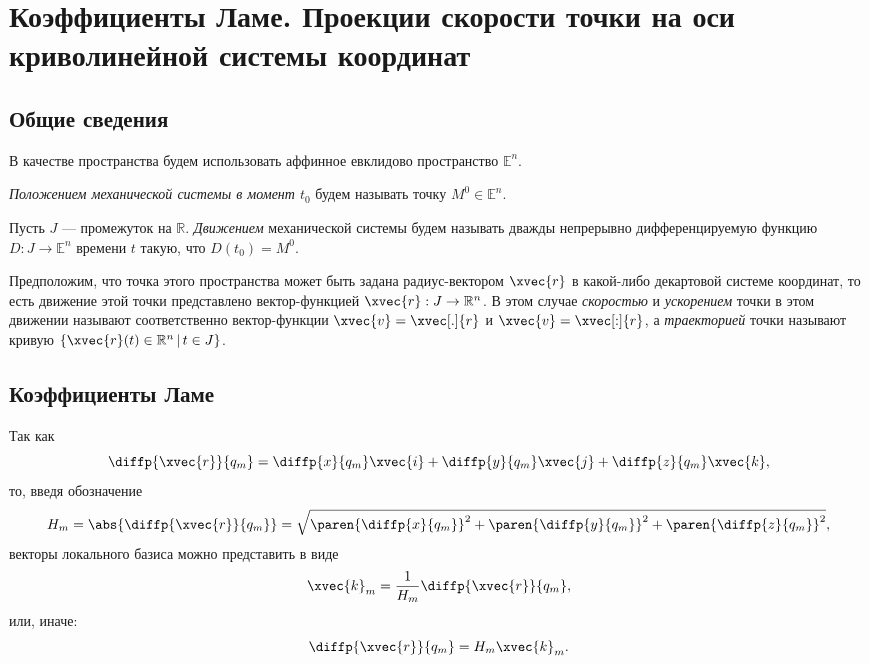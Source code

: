 \section{Коэффициенты Ламе. Проекции скорости точки на оси криволинейной
системы координат}

\subsection{Общие сведения}

В качестве пространства будем использовать аффинное евклидово пространство
$\mathbb{E}^n$.

\begin{definition}
  \textit{Положением механической системы в момент $t_0$} будем называть точку
  $M^0 \in \mathbb{E}^n$.
\end{definition}

\begin{definition}
  Пусть $J$ --- промежуток на $\mathbb{R}$. \textit{Движением} механической
  системы будем называть дважды непрерывно дифференцируемую функцию $D : J \to
  \mathbb{E}^n$ времени $t$ такую, что $D(t_0) = M^0$.
\end{definition}

\begin{definition}
  Предположим, что точка этого пространства может быть задана радиус-вектором
  $\xvec{r}$ в какой-либо декартовой системе координат, то есть движение этой
  точки представлено вектор-функцией $\xvec{r} : J \to \mathbb{R}^n$. В этом
  случае \textit{скоростью} и \textit{ускорением} точки в этом движении
  называют соответственно вектор-функции $\xvec{v} = \xvec[.]{r}$ и
  $\xvec{v} = \xvec[:]{r}$, а \textit{траекторией} точки называют кривую
  $\{ \xvec{r}(t) \in \mathbb{R}^n \, | \, t \in J \}$.
\end{definition}


\subsection{Коэффициенты Ламе}

Так как
\begin{equation}
  \diffp{\xvec{r}}{{q_m}} = \diffp{x}{{q_m}} \xvec{i} + \diffp{y}{{q_m}} \xvec{j} +
  \diffp{z}{{q_m}} \xvec{k},
\end{equation}
то, введя обозначение
\begin{equation}
  H_m = \abs{\diffp{\xvec{r}}{{q_m}}} = \sqrt{\paren{\diffp{x}{{q_m}}}^2 +
  \paren{\diffp{y}{{q_m}}}^2 + \paren{\diffp{z}{{q_m}}}^2},
\end{equation}
векторы локального базиса можно представить в виде
\begin{equation}
  \label{eq:local_basis_vec}
  \xvec{k}_m = \frac{1}{H_m} \diffp{\xvec{r}}{{q_m}},
\end{equation}
или, иначе:
\begin{equation}
  \label{eq:local_basis_vec_alt}
  \diffp{\xvec{r}}{{q_m}} = H_m \xvec{k}_m.
\end{equation}

